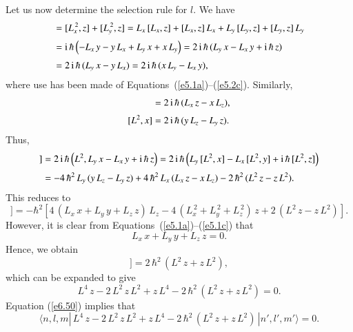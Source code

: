 Let us now determine the selection rule for $l$. We have
\begin{align}
[L^2, z] &= [L_x^{\,2}, z] + [L_y^{\,2}, z] = L_x\,[L_x, z] + [L_x, z] \,L_x + L_y\,[L_y, z] + [L_y, z]\, L_y\nonumber\\[0.5ex]
         &= {\rm i}\,\hbar\left( -L_x\, y - y\, L_x + L_y \,x + x \,L_y\right)= 2 \,{\rm i} \, \hbar \,( L_y \,x - L_x \,y + {\rm i}\,\hbar\,z)\nonumber\\[0.5ex]
	 &= 2 \,{\rm i}\, \hbar \,( L_y\, x - y \,L_x ) =  2\, {\rm i}\, \hbar\,
 ( x\, L_y - L_x \,y),
\end{align}
where use has been made of Equations~(\ref{e5.1a})--(\ref{e5.2c}). 
Similarly, 
\begin{align}
[L^2, y] &= 2\,{\rm i}\, \hbar \,(  L_x\, z  - x\, L_z  ),\\[0.5ex]
[L^2, x] &= 2\,{\rm i}\, \hbar\, ( y \,L_z - L_y \,z).
\end{align}
Thus,
\begin{align}
[L^2, [L^2, z]] &= 2 \,{\rm i} \, \hbar \left( L^2, L_y \,x - L_x\, y + {\rm i}\,\hbar\,z
\right)= 2\,{\rm i}\,\hbar \left( L_y\, [L^2, x] - L_x\, [ L^2, y] + {\rm i}\,\hbar\,
[L^2, z]\right)\nonumber\\[0.5ex]
&= - 4\, \hbar^2 \,L_y\,(y\, L_z - L_y \,z) + 4\,\hbar^2 \,L_x\,(L_x\, z - x\, L_z)- 2\, \hbar^2\,(L^2 \,z - z\, L^2).
\end{align}
This reduces to
\begin{equation}
[L^2, [L^2, z]] = - \hbar^2 \left[4\,(L_x\, x + L_y \,y + L_z \,z)\, L_z - 4\,
(L_x^{\,2} + L_y^{\,2} + L_z^{\,2})\, z + 2 \,(L^2\, z - z\, L^2)\right].
\end{equation}
However, it is clear from Equations~(\ref{e5.1a})--(\ref{e5.1c}) that
\begin{equation}
L_x \,x + L_y \,y + L_z \,z = 0.
\end{equation}
Hence, we obtain
\begin{equation}
[L^2, [L^2, z]] = 2 \,\hbar^2\, (L^2\, z + z \,L^2),
\end{equation}
which can be expanded to give
\begin{equation}\label{e6.50}
L^4 \,z - 2\, L^2 \,z\, L^2 + z\, L^4 - 2\, \hbar^2\, (L^2 \,z +z \,L^2) = 0.
\end{equation}
Equation (\ref{e6.50}) implies that
\begin{equation}
\langle n,l,m|\, L^4\, z - 2\, L^2\, z \,L^2 + z\, L^4 - 2 \,\hbar^2 \,(L^2\, z +z\, L^2)\, |n',l',m'
\rangle = 0.
\end{equation}
